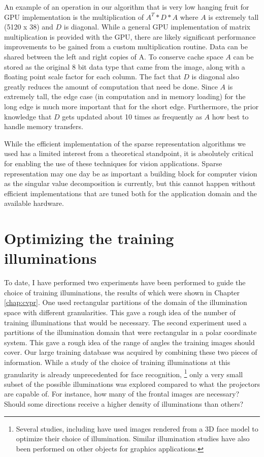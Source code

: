 An example of an operation in our algorithm that is very low hanging fruit for
GPU implementation is the multiplication of $A^T * D * A$ where $A$ is
extremely tall (5120 x 38) and $D$ is diagonal.  While a general GPU
implementation of matrix multiplication is provided with the GPU, there are
likely significant performance improvements to be gained from a custom
multiplication routine.  Data can be shared between the left and right copies
of A.  To conserve cache space $A$ can be stored as the original 8 bit data
type that came from the image, along with a floating point scale factor for
each column.  The fact that $D$ is diagonal also greatly reduces the amount of
computation that need be done.  Since $A$ is extremely tall, the edge case (in
computation and in memory loading) for  the long edge is much more important
that for the short edge.  Furthermore, the prior knowledge that $D$ gets
updated about 10 times as frequently as $A$ how best to handle memory
transfers.

While the efficient implementation of the sparse representation algorithms we
used has a limited interest from a theoretical standpoint, it is absolutely
critical for enabling the use of these techniques for vision applications.
Sparse representation may one day be as important a building block for computer
vision as the singular value decomposition is currently, but this cannot happen
without efficient implementations that are tuned both for the application
domain and the available hardware.  

\section{Optimizing the training illuminations} 
To date, I have performed two experiments have been performed to guide the
choice of training illuminations, the results of which were shown in Chapter
\ref{chap:cvpr}.  One used rectangular partitions of the domain of the
illumination space with different granularities.  This gave a rough idea of the
number of training illuminations that would be necessary.  The second
experiment used a partitions of the illumination domain that were rectangular
in a polar coordinate system.  This gave a rough idea of the range of angles
the training images should cover.  Our large training database was acquired by
combining these two pieces of information.  While a study of the choice of
training illuminations at this granularity is already unprecedented for face
recognition, \footnote{ Several studies, including \cite{Basri2003-PAMI,
LeeK2005-PAMI} have used images rendered from a 3D face model to optimize their
choice of illumination.  Similar illumination studies have also been performed
on other objects for graphics applications.} only a very small subset of the
possible illuminations was explored compared to what the projectors are capable
of.  For instance, how many of the frontal images are necessary?  Should some
directions receive a higher density of illuminations than others? 

